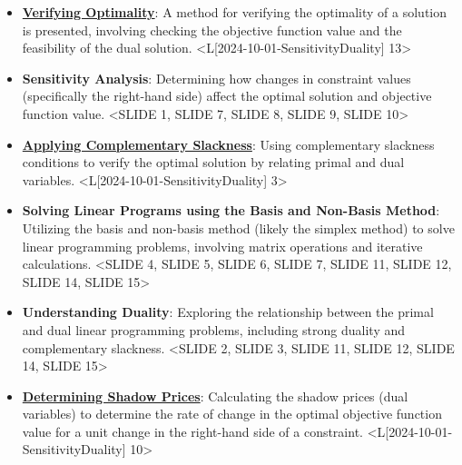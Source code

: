 \documentclass{article}%
\begin{document}
\begin{itemize}[[leftmargin=*]]%
\item \href{https://www.math.purdue.edu/~yipn/421/2024-10-01-SensitivityDuality.pdf#page=13}{\textbf{Verifying Optimality}}: A method for verifying the optimality of a solution is presented, involving checking the objective function value and the feasibility of the dual solution. <L[2024-10-01-SensitivityDuality] 13>%
\item \textbf{Sensitivity Analysis}: Determining how changes in constraint values (specifically the right-hand side) affect the optimal solution and objective function value. <SLIDE 1, SLIDE 7, SLIDE 8, SLIDE 9, SLIDE 10>%
\item \href{https://www.math.purdue.edu/~yipn/421/2024-10-01-SensitivityDuality.pdf#page=3}{\textbf{Applying Complementary Slackness}}: Using complementary slackness conditions to verify the optimal solution by relating primal and dual variables. <L[2024-10-01-SensitivityDuality] 3>%
\item \textbf{Solving Linear Programs using the Basis and Non{-}Basis Method}: Utilizing the basis and non-basis method (likely the simplex method) to solve linear programming problems, involving matrix operations and iterative calculations. <SLIDE 4, SLIDE 5, SLIDE 6, SLIDE 7, SLIDE 11, SLIDE 12, SLIDE 14, SLIDE 15>%
\item \textbf{Understanding Duality}: Exploring the relationship between the primal and dual linear programming problems, including strong duality and complementary slackness. <SLIDE 2, SLIDE 3, SLIDE 11, SLIDE 12, SLIDE 14, SLIDE 15>%
\item \href{https://www.math.purdue.edu/~yipn/421/2024-10-01-SensitivityDuality.pdf#page=10}{\textbf{Determining Shadow Prices}}: Calculating the shadow prices (dual variables) to determine the rate of change in the optimal objective function value for a unit change in the right-hand side of a constraint. <L[2024-10-01-SensitivityDuality] 10>%
\end{itemize}%
\end{document}
